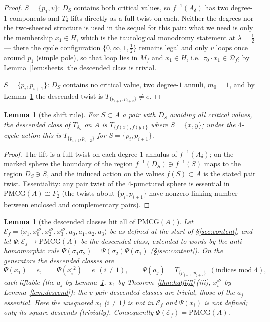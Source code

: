 \documentclass[11pt]{article}
\newcommand{\Ef}{\mathcal E_f}
\newtheorem{lemma}[theorem]{Lemma}
\theoremstyle{definition}
\theoremstyle{remark}
\newcommand{\PMCG}{\mathrm{PMCG}}
\newcommand{\Df}{\mathcal D_f}
\begin{document}
\begin{proof}
$S=\{p_1,v\}$: $D_S$ contains both critical values, so
$f^{-1}(A_\delta)$ has two degree-$1$ components and $T_\delta$ lifts
directly as a full twist on each.  Neither the degrees nor the
two-sheeted structure is used in the sequel for this pair: what we need
is only the membership $x_1\in H$, which is the tautological monodromy
statement at $\lambda=\tfrac12$ — there the cycle configuration
$\{0,\infty,1,\tfrac12\}$ remains legal and only $v$ loops once around
$p_1$ (simple pole), so that loop lies in $M_f$ and $x_1\in H$,
i.e.\ $\tau_0\cdot x_1\in\Df$; by Lemma~\ref{lem:sheets} the descended
class is trivial.

$S=\{p_i,p_{i+1}\}$: $D_S$ contains no critical value, two degree-$1$
annuli, $m_0=1$, and by Lemma~\ref{lem:shift} the descended twist is
$T_{\{p_{i+1},p_{i+2}\}}\neq e$.
\end{proof}

\begin{lemma}[the shift rule]\label{lem:shift}
For $S\subset A$ a pair with $D_S$ avoiding all critical values, the
descended class of $T_{\delta_S}$ on $A$ is $T_{\{f(x),f(y)\}}$ where
$S=\{x,y\}$; under the $4$-cycle action this is
$T_{\{p_{i+1},p_{i+2}\}}$ for $S=\{p_i,p_{i+1}\}$.
\end{lemma}

\begin{proof}
The lift is a full twist on each degree-$1$ annulus of
$f^{-1}(A_\delta)$; on the marked sphere the boundary of the region
$f^{-1}(D_S)\ni f^{-1}(S)$ maps to the region $D_S\ni S$, and the
induced action on the values $f(S)\subset A$ is the stated pair twist.
Essentiality: any pair twist of the $4$-punctured sphere is essential
in $\PMCG(A)\cong F_2$ (the twists about $\{p_i,p_{i+1}\}$ have
nonzero linking number between enclosed and complementary pairs).
\end{proof}

\begin{lemma}[the descended classes hit all of
$\PMCG(A)$]\label{lem:allpairs}
Let $\Ef=\langle x_1,x_0^{\circ2},x_2^{\circ2},x_3^{\circ2},
a_0,a_1,a_2,a_3\rangle$ be as defined at the start of
\S\ref{sec:content}, and let $\Psi:\Ef\to\PMCG(A)$ be the descended
class, extended to words by the anti-homomorphic rule
$\Psi(\sigma_1\sigma_2)=\Psi(\sigma_2)\Psi(\sigma_1)$
\textup{(}\S\ref{sec:content}\textup{)}.  On the generators the
descended classes are
\[
\Psi(x_1)=e,\qquad
\Psi(x_i^{\circ2})=e\ \ (i\neq1),\qquad
\Psi(a_j)=T_{\{p_{j+1},p_{j+2}\}}\ \ (\text{indices mod }4),
\]
each \emph{liftable} \textup{(}the $a_j$ by Lemma~\ref{lem:shift},
$x_1$ by Theorem~\ref{thm:halflift}\,\textup{(}iii\textup{)},
$x_i^{\circ2}$ by Lemma~\ref{lem:descend}\textup{)}; the $v$-pair
descended classes are trivial, those of the $a_j$ essential.  Here the
unsquared $x_i$ ($i\neq1$) is \emph{not} in $\Ef$ and $\Psi(x_i)$ is
not defined; only its square descends (trivially).  Consequently
$\Psi(\Ef)=\PMCG(A)$.
\end{lemma}
\end{document}
